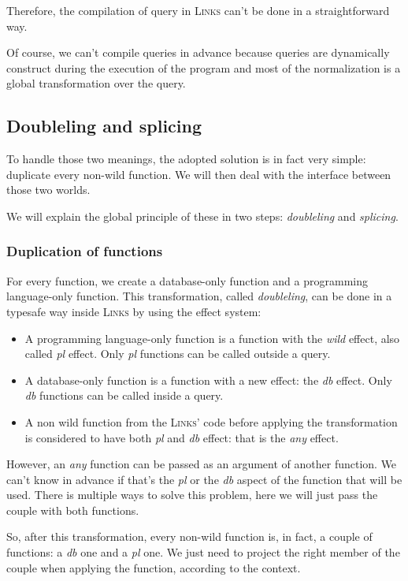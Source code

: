 \documentclass[11pt]{article}
\newcommand\mysc[1]{{\rmfamily\textsc{#1}}\xspace}
\newcommand\links{\mysc{Links}}
\newcommand\effect[1]{{\em #1}}
\begin{document}
Therefore, the compilation of query in \links can't be done in a straightforward way.

Of course, we can't compile queries in advance because queries are dynamically construct during the execution of the program and most of the normalization is a global transformation over the query.  

\subsection{Doubleling and splicing}

To handle those two meanings, the adopted solution is in fact very simple: duplicate every non-wild function. We will then deal with the interface between those two worlds.

We will explain the global principle of these in two steps: \emph{doubleling} and \emph{splicing}.

\subsubsection{Duplication of functions}

For every function, we create a database-only function and a programming language-only function. This transformation, called \emph{doubleling}, can be done in a typesafe way inside \links by using the effect system: 
\begin{itemize}
\item A programming language-only function is a function with the \effect{wild} effect, also called \effect{pl} effect. Only \effect{pl} functions can be called outside a query.
\item A database-only function is a function with a new effect: the \effect{db} effect. Only \effect{db} functions can be called inside a query.
\item A non wild function from the \links' code before applying the transformation is considered to have both \effect{pl} and \effect{db} effect: that is the \effect{any} effect.
\end{itemize}

However, an \effect{any} function can be passed as an argument of another function. We can't know in advance if that's the \effect{pl} or the \effect{db} aspect of the function that will be used. There is multiple ways to solve this problem, here we will just pass the couple with both functions.

So, after this transformation, every non-wild function is, in fact, a couple of functions: a \effect{db} one and a \effect{pl} one. We just need to project the right member of the couple when applying the function, according to the context.
\end{document}
